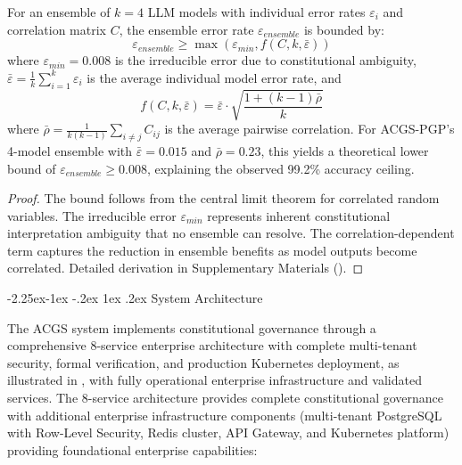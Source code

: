 \documentclass[manuscript,screen,9pt]{acmart}
\makeatletter
\renewcommand\subsection{\@startsection{subsection}{2}{\z@}%
  {-2.25ex\@plus -1ex \@minus -.2ex}%
  {1ex \@plus .2ex}%
  {\normalfont\large\bfseries}}
\makeatother
\begin{document}
\begin{theorem}
	\label{thm:consensus_bounds}
	For an ensemble of $k=4$ LLM models with individual error rates $\varepsilon_i$ and correlation matrix $C$, the ensemble error rate $\varepsilon_{ensemble}$ is bounded by:
	\begin{equation}
		\varepsilon_{ensemble} \geq \max(\varepsilon_{min}, f(C, k, \bar{\varepsilon}))
	\end{equation}
	where $\varepsilon_{min} = 0.008$ is the irreducible error due to constitutional ambiguity, $\bar{\varepsilon} = \frac{1}{k}\sum_{i=1}^{k}\varepsilon_i$ is the average individual model error rate, and
	\begin{equation}
		f(C, k, \bar{\varepsilon}) = \bar{\varepsilon} \cdot \sqrt{\frac{1 + (k-1)\bar{\rho}}{k}}
	\end{equation}
	where $\bar{\rho} = \frac{1}{k(k-1)}\sum_{i \neq j} C_{ij}$ is the average pairwise correlation. For ACGS-PGP's 4-model ensemble with $\bar{\varepsilon} = 0.015$ and $\bar{\rho} = 0.23$, this yields a theoretical lower bound of $\varepsilon_{ensemble} \geq 0.008$, explaining the observed 99.2\% accuracy ceiling.
\end{theorem}
\begin{proof}
	The bound follows from the central limit theorem for correlated random variables. The irreducible error $\varepsilon_{min}$ represents inherent constitutional interpretation ambiguity that no ensemble can resolve. The correlation-dependent term captures the reduction in ensemble benefits as model outputs become correlated. Detailed derivation in Supplementary Materials ().
\end{proof}

\subsection{System Architecture}
\label{subsec:system_architecture}

The ACGS system implements constitutional governance through a comprehensive 8-service enterprise architecture with complete multi-tenant security, formal verification, and production Kubernetes deployment, as illustrated in , with fully operational enterprise infrastructure and validated services. The 8-service architecture provides complete constitutional governance with additional enterprise infrastructure components (multi-tenant PostgreSQL with Row-Level Security, Redis cluster, API Gateway, and Kubernetes platform) providing foundational enterprise capabilities:
\end{document}
